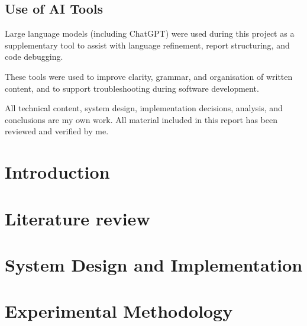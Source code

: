 \begin{uomacknowledgements}
	\section*{Use of AI Tools}
	Large language models (including ChatGPT) were used during this project as a supplementary tool to assist with language refinement, report structuring, and code debugging. 
	
	These tools were used to improve clarity, grammar, and organisation of written content, and to support troubleshooting during software development. 
	
	All technical content, system design, implementation decisions, analysis, and conclusions are my own work. All material included in this report has been reviewed and verified by me.
\end{uomacknowledgements}



\uomstartmainbody %
\clearpage
{}
\setcounter{page}{1}


\section{Introduction} \label{sec:introduction} %



\section{Literature review} \label{sec:Literature Review}



\section{System Design and Implementation} \label{sec:implementation}



\section{Experimental Methodology} \label{sec:experiments}

%


